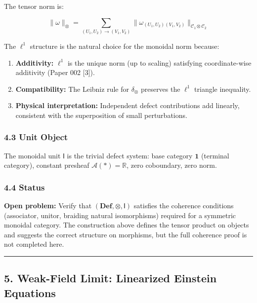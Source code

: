 \documentclass[
]{article}
\providecommand{\tightlist}{%
  \setlength{\itemsep}{0pt}\setlength{\parskip}{0pt}}
\begin{document}
The tensor norm is:

\[\|\omega\|_\otimes = \sum_{(U_1, U_2) \to (V_1, V_2)} \|\omega_{(U_1,U_2)(V_1,V_2)}\|_{\mathcal{C}_1 \otimes \mathcal{C}_2}\]

The \(\ell^1\) structure is the natural choice for the monoidal norm
because:

\begin{enumerate}
\def\labelenumi{\arabic{enumi}.}
\tightlist
\item
  \textbf{Additivity:} \(\ell^1\) is the unique norm (up to scaling)
  satisfying coordinate-wise additivity (Paper 002 {[}3{]}).
\item
  \textbf{Compatibility:} The Leibniz rule for \(\delta_\otimes\)
  preserves the \(\ell^1\) triangle inequality.
\item
  \textbf{Physical interpretation:} Independent defect contributions add
  linearly, consistent with the superposition of small perturbations.
\end{enumerate}

\subsubsection{4.3 Unit Object}\label{unit-object}

The monoidal unit \(\mathsf{I}\) is the trivial defect system: base
category \(\mathbf{1}\) (terminal category), constant presheaf
\(\mathcal{A}(\ast) = \mathbb{R}\), zero coboundary, zero norm.

\subsubsection{4.4 Status}\label{status}

\textbf{Open problem:} Verify that
\((\mathbf{Def}, \otimes, \mathsf{I})\) satisfies the coherence
conditions (associator, unitor, braiding natural isomorphisms) required
for a symmetric monoidal category. The construction above defines the
tensor product on objects and suggests the correct structure on
morphisms, but the full coherence proof is not completed here.

\begin{center}\rule{0.5\linewidth}{0.5pt}\end{center}

\subsection{5. Weak-Field Limit: Linearized Einstein
Equations}\label{weak-field-limit-linearized-einstein-equations}
\end{document}
